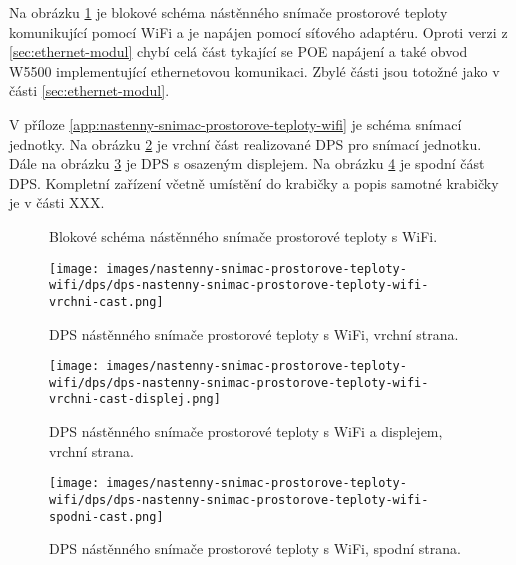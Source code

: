 Na obrázku \ref{fig:blokove-schema-nastenny-snimac-teploty-wifi} je blokové schéma nástěnného snímače prostorové teploty komunikující pomocí WiFi a je napájen pomocí síťového adaptéru. Oproti verzi z \ref{sec:ethernet-modul} chybí celá část tykající se POE napájení a také obvod W5500 implementující ethernetovou komunikaci. Zbylé části jsou totožné jako v části \ref{sec:ethernet-modul}.

V příloze \ref{app:nastenny-snimac-prostorove-teploty-wifi} je schéma snímací jednotky. Na obrázku \ref{fig:dps-nastenny-snimac-prostorove-teploty-wifi-vrchni-cast} je vrchní část realizované DPS pro snímací jednotku. Dále na obrázku \ref{fig:dps-nastenny-snimac-prostorove-teploty-wifi-vrchni-cast-displej} je DPS s osazeným displejem. Na obrázku \ref{fig:dps-nastenny-snimac-prostorove-teploty-wifi-spodni-cast} je spodní část DPS. Kompletní zařízení včetně umístění do krabičky a popis samotné krabičky je v části XXX.

\begin{figure}[H]
    \centering
    \def\svgwidth{\columnwidth}
    
    \caption[]{Blokové schéma nástěnného snímače prostorové teploty s WiFi.}
    \label{fig:blokove-schema-nastenny-snimac-teploty-wifi}
\end{figure}

\begin{figure}[H]
    \centering
    \texttt{[image: images/nastenny-snimac-prostorove-teploty-wifi/dps/dps-nastenny-snimac-prostorove-teploty-wifi-vrchni-cast.png]}
    \caption{DPS nástěnného snímače prostorové teploty s WiFi, vrchní strana.}
    \label{fig:dps-nastenny-snimac-prostorove-teploty-wifi-vrchni-cast}
\end{figure}

\begin{figure}[H]
    \centering
    \texttt{[image: images/nastenny-snimac-prostorove-teploty-wifi/dps/dps-nastenny-snimac-prostorove-teploty-wifi-vrchni-cast-displej.png]}
    \caption{DPS nástěnného snímače prostorové teploty s WiFi a displejem, vrchní strana.}
    \label{fig:dps-nastenny-snimac-prostorove-teploty-wifi-vrchni-cast-displej}
\end{figure}

\begin{figure}[H]
    \centering
    \texttt{[image: images/nastenny-snimac-prostorove-teploty-wifi/dps/dps-nastenny-snimac-prostorove-teploty-wifi-spodni-cast.png]}
    \caption{DPS nástěnného snímače prostorové teploty s WiFi, spodní strana.}
    \label{fig:dps-nastenny-snimac-prostorove-teploty-wifi-spodni-cast}
\end{figure}
